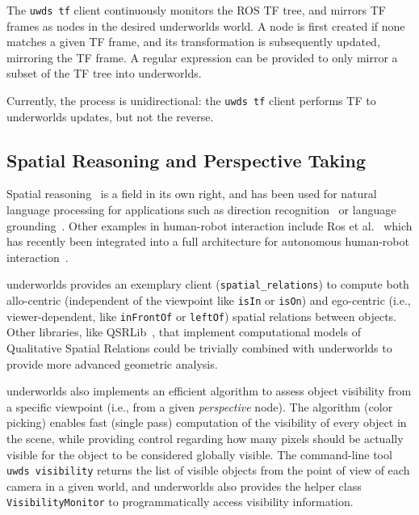 \documentclass[letterpaper, 10pt, conference]{ieeeconf}
\newcommand{\etal}{et al.\xspace}
\newcommand{\ie}{i.e.,\xspace}
\newcommand{\uwds}{{\sc underworlds}\xspace}
\begin{document}
The {\tt uwds tf} client continuously monitors the ROS TF tree, and mirrors
TF frames as nodes in the desired \uwds world. A node is first created if none
matches a given TF frame, and its transformation is subsequently updated,
mirroring the TF frame. A regular expression can be provided to only mirror a
subset of the TF tree into \uwds.

Currently, the process is unidirectional: the {\tt uwds tf} client performs TF
to \uwds updates, but not the reverse.

\subsection{Spatial Reasoning and Perspective Taking}
\label{spatial}

Spatial reasoning~\cite{O'Keefe1999} is a field in its own right, and has been
used for natural language processing for applications such as direction
recognition~\cite{Kollar2010,Matuszek2010} or language
grounding~\cite{Tellex2010}. Other examples in human-robot interaction include Ros
\etal~\cite{ros2010solving, ros2010which} which has recently been integrated
into a full architecture for autonomous human-robot
interaction~\cite{lemaignan2016artificial}.


\uwds provides an exemplary client ({\tt spatial\_relations}) to compute both
allo-centric (independent of the viewpoint like {\tt isIn} or {\tt isOn}) and
ego-centric (\ie viewer-dependent, like {\tt inFrontOf} or {\tt leftOf}) spatial relations
between objects.
Other libraries, like QSRLib~\cite{gatsoulis2016qsrlib}, that implement
computational models of Qualitative Spatial Relations could be trivially
combined with \uwds to provide more advanced geometric analysis.


\uwds also implements an efficient algorithm to assess object visibility from a
specific viewpoint (\ie from a given \emph{perspective} node). The algorithm (color
picking) enables fast (single pass) computation of the visibility of every
object in the scene, while providing control regarding how many pixels should be actually
visible for the object to be considered globally visible. The
command-line tool {\tt uwds visibility} returns the list of visible objects from
the point of view of each camera in a given world, and \uwds also provides the
helper class {\tt VisibilityMonitor} to programmatically access visibility
information.
\end{document}
